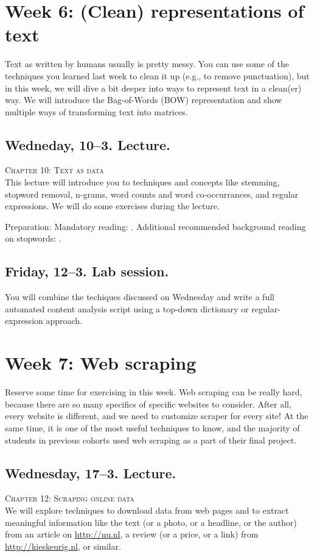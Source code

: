 \section*{Week 6: (Clean) representations of text}
Text as written by humans usually is pretty messy. You can use some of the techniques you learned last week to clean it up (e.g., to remove punctuation), but in this week, we will dive a bit deeper into ways to represent text in a clean(er) way. We will introduce the Bag-of-Words (BOW) representation and show multiple ways of transforming text into matrices.



\subsection*{Wedneday, 10--3. Lecture.}
\textsc{ Chapter 10: Text as data}\\
This lecture will introduce you to techniques and concepts like stemming, stopword removal, n-grams, word counts and word co-occurrances, and regular expressions. We will do some exercises during the lecture.

Preparation: Mandatory reading: \cite{Boumans2016}. Additional recommended background reading on stopwords: \cite{Nothmann2018}.


\subsection*{Friday, 12--3. Lab session.}
You will combine the techiques discussed on Wednesday and write a full automated content analysis script using a top-down dictionary or regular-expression approach.





\section*{Week 7: Web scraping}
Reserve some time for exercising in this week. Web scraping can be really hard, because there are so many specifics of specific websites to consider. After all, every website is different, and we need to customize scraper for every site! At the same time, it is one of the most useful techniques to know, and the majority of students in previous cohorts used web scraping as a part of their final project.

\subsection*{Wednesday, 17--3. Lecture.}
\textsc{ Chapter 12: Scraping online data}\\
We will explore techniques to download data from web pages and to extract meaningful information like the text (or a photo, or a headline, or the author) from an article on \url{http://nu.nl}, a review (or a price, or a link) from \url{http://kieskeurig.nl}, or similar.

